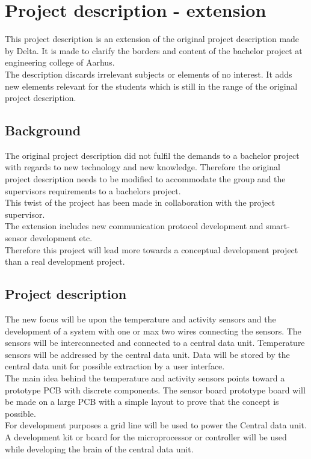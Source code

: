 \chapter{Project description - extension}
This project description is an extension of the original project description made by Delta. It is made to clarify the borders and content of the bachelor project at engineering college of Aarhus.\\
The description discards irrelevant subjects or elements of no interest. It adds new elements relevant for the students which is still in the range of the original project description.


\section{Background}
The original project description did not fulfil the demands to a bachelor project with regards to new technology and new knowledge. Therefore the original project description needs to be modified to accommodate the group and the supervisors requirements to a bachelors project. \\
This twist of the project has been made in collaboration with the project supervisor.\\
The extension includes new communication protocol development and smart-sensor development etc.\\
Therefore this project will lead more towards a conceptual development project than a real development project.\\


\section{Project description}
The new focus will be upon the temperature and activity sensors and the development of a system with one or max two wires connecting the sensors. The sensors will be interconnected and connected to a central data unit. Temperature sensors will be addressed by the central data  unit. Data will be stored by the central data unit for possible extraction by a user interface. \\

The main idea behind the temperature and activity sensors points toward a prototype PCB with discrete components. The sensor board prototype board will be made on a large PCB with a simple layout to prove that the concept is possible. \\

For development purposes a grid line will be used to power the Central data unit. A development kit or board for the microprocessor or controller  will be used while developing the brain of the central data unit. \\

